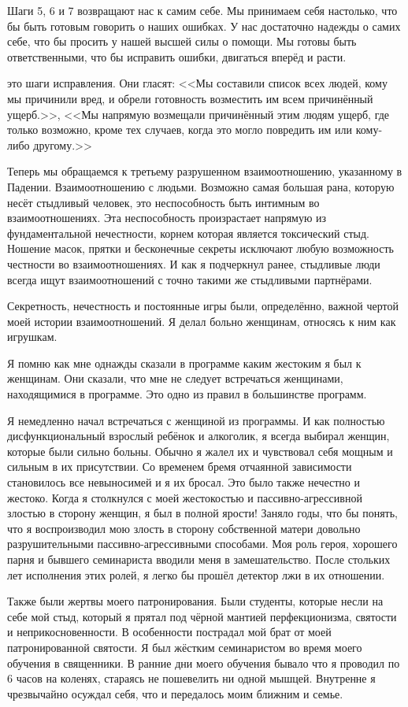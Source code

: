 \documentclass[10pt, fleqn]{article}
\begin{document}
Шаги 5, 6 и 7 возвращают нас к самим себе. Мы принимаем себя настолько, что бы быть готовым говорить о наших ошибках. У нас достаточно надежды о самих себе, что бы просить у нашей высшей силы о помощи. Мы готовы быть ответственными, что бы исправить ошибки, двигаться вперёд и расти.

 это шаги исправления. Они гласят: <<Мы составили список всех людей, кому мы причинили вред, и обрели готовность возместить им всем причинённый ущерб.>>, <<Мы напрямую возмещали причинённый этим людям ущерб, где только возможно, кроме тех случаев, когда это могло повредить им или кому-либо другому.>>

Теперь мы обращаемся к третьему разрушенном взаимоотношению, указанному в Падении. Взаимоотношению с людьми. Возможно самая большая рана, которую несёт стыдливый человек, это неспособность быть интимным во взаимоотношениях. Эта неспособность произрастает напрямую из фундаментальной нечестности, корнем которая является токсический стыд. Ношение масок, прятки и бесконечные секреты исключают любую возможность честности во взаимоотношениях. И как я подчеркнул ранее, стыдливые люди всегда ищут взаимоотношений с точно такими же стыдливыми партнёрами.

Секретность, нечестность и постоянные игры были, определённо, важной чертой моей истории взаимоотношений. Я делал больно женщинам, относясь к ним как игрушкам.

Я помню как мне однажды сказали в программе каким жестоким я был к женщинам. Они сказали, что мне не следует встречаться женщинами, находящимися в программе. Это одно из правил в большинстве программ.


Я немедленно начал встречаться с женщиной из программы. И как полностью дисфункциональный взрослый ребёнок и алкоголик, я всегда выбирал женщин, которые были сильно больны. Обычно я жалел их и чувствовал себя мощным и сильным в их присутствии. Со временем бремя отчаянной зависимости становилось все невыносимей и я их бросал. Это было также нечестно и жестоко. Когда я столкнулся с моей жестокостью и пассивно-агрессивной злостью в сторону женщин, я был в полной ярости! Заняло годы, что бы понять, что я воспроизводил мою злость в сторону собственной матери довольно разрушительными пассивно-агрессивными способами. Моя роль героя, хорошего парня и бывшего семинариста вводили меня в замешательство. После стольких лет исполнения этих ролей, я легко бы прошёл детектор лжи в их отношении.

Также были жертвы моего патронирования. Были студенты, которые несли на себе мой стыд, который я прятал под чёрной мантией перфекционизма, святости и неприкосновенности. В особенности пострадал мой брат от моей патронированной святости. Я был жёстким семинаристом во время моего обучения в священники. В ранние дни моего обучения бывало что я проводил по 6 часов на коленях, стараясь не пошевелить ни одной мышцей. Внутренне я чрезвычайно осуждал себя, что и передалось моим ближним и семье.
\end{document}
